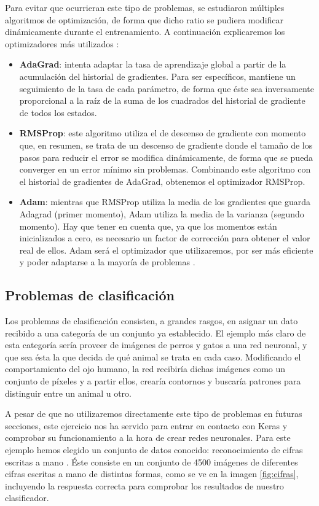 Para evitar que ocurrieran este tipo de problemas, se estudiaron múltiples algoritmos de optimización, de forma que dicho ratio se pudiera modificar dinámicamente durante el entrenamiento. A continuación explicaremos los optimizadores más utilizados \citep{NIPS2017_7003}:

\begin{itemize}
    \item \textbf{AdaGrad}: intenta adaptar la tasa de aprendizaje global a partir de la acumulación del historial de gradientes. Para ser específicos, mantiene un seguimiento de la tasa de cada parámetro, de forma que éste sea inversamente proporcional a la raíz de la suma de los cuadrados del historial de gradiente de todos los estados.
    \item \textbf{RMSProp}: este algoritmo utiliza el de descenso de gradiente con momento que, en resumen, se trata de un descenso de gradiente donde el tamaño de los pasos para reducir el error se modifica dinámicamente, de forma que se pueda converger en un error mínimo sin problemas. Combinando este algoritmo con el historial de gradientes de AdaGrad, obtenemos el optimizador RMSProp. 
    \item \textbf{Adam}: mientras que RMSProp utiliza la media de los gradientes que guarda Adagrad (primer momento), Adam utiliza la media de la varianza (segundo momento). Hay que tener en cuenta que, ya que los momentos están inicializados a cero, es necesario un factor de corrección para obtener el valor real de ellos. Adam será el optimizador que utilizaremos, por ser más eficiente y poder adaptarse a la mayoría de problemas \citep[cap. 4]{Buduma:general}.  
\end{itemize}

\subsection{Problemas de clasificación}
\label{sec:classif_NN}
Los problemas de clasificación consisten, a grandes rasgos, en asignar un dato recibido a una categoría de un conjunto ya establecido. El ejemplo más claro de esta categoría sería proveer de imágenes de perros y gatos a una red neuronal, y que sea ésta la que decida de qué animal se trata en cada caso. Modificando el comportamiento del ojo humano, la red recibiría dichas imágenes como un conjunto de píxeles y a partir ellos, crearía contornos y buscaría patrones para distinguir entre un animal u otro.

A pesar de que no utilizaremos directamente este tipo de problemas en futuras secciones, este ejercicio nos ha servido para entrar en contacto con Keras y comprobar su funcionamiento a la hora de crear redes neuronales. Para este ejemplo hemos elegido un conjunto de datos conocido: reconocimiento de cifras escritas a mano \citep{lecun-mnisthandwrittendigit-2010}. Éste consiste en un conjunto de 4500 imágenes de diferentes cifras escritas a mano de distintas formas, como se ve en la imagen \ref{fig:cifras}, incluyendo la respuesta correcta para comprobar los resultados de nuestro clasificador.

